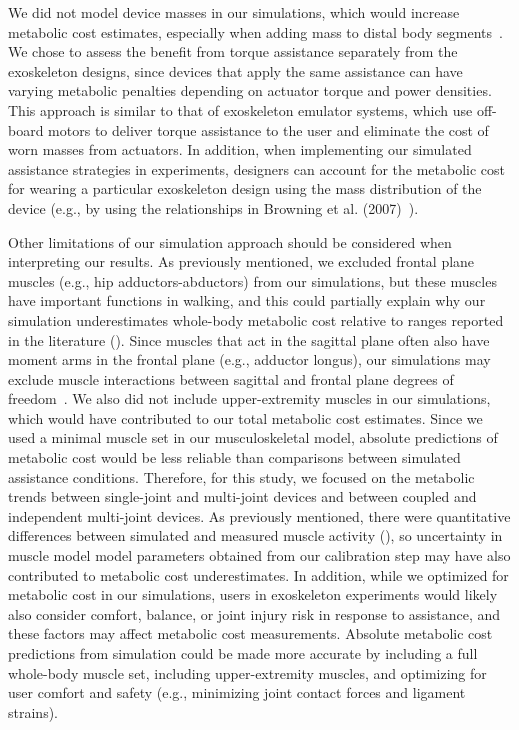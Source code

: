 \documentclass[10pt,letterpaper]{article}
\providecommand{\DIFaddtex}[1]{{\protect\color{blue}{#1}}} %
\providecommand{\DIFaddbegin}{} %
\providecommand{\DIFaddend}{} %
\providecommand{\DIFadd}[1]{\texorpdfstring{\DIFaddtex{#1}}{#1}} %
\newcommand{\DIFaddincludegraphics}[2][]{{\color{blue}\fbox{\DIFOincludegraphics[#1]{#2}}}} %
\DeclareRobustCommand{\DIFaddbegin}{\DIFOaddbegin \let\includegraphics\DIFaddincludegraphics} %
\DeclareRobustCommand{\DIFaddend}{\DIFOaddend \let\includegraphics\DIFOincludegraphics} %
\begin{document}
We did not model device masses in our simulations, which would increase metabolic cost estimates, especially when adding mass to distal body segments~\cite{Browning:2007}. We chose to assess the benefit from torque assistance separately from the exoskeleton designs, since devices that apply the same assistance can have varying metabolic penalties depending on actuator torque and power densities. This approach is similar to that of exoskeleton emulator systems, which use off-board motors to deliver torque assistance to the user and eliminate the cost of worn masses from actuators. In addition, when implementing our simulated assistance strategies in experiments, designers can account for the metabolic cost for wearing a particular exoskeleton design using the mass distribution of the device (e.g., by using the relationships in Browning et al. (2007)~\cite{Browning:2007}).

Other limitations of our simulation approach should be considered when interpreting our results. As previously mentioned, we excluded frontal plane muscles (e.g., hip adductors-abductors) from our simulations, but these muscles have important functions in walking, and this could partially explain why our simulation underestimates whole-body metabolic cost relative to ranges reported in the literature (). Since muscles that act in the sagittal plane often also have moment arms in the frontal plane (e.g., adductor longus), our simulations may exclude muscle interactions between sagittal and frontal plane degrees of freedom~\cite{Dembia:2017}. We also did not include upper-extremity muscles in our simulations, which would have contributed to our total metabolic cost estimates. Since we used a minimal muscle set in our musculoskeletal model, absolute predictions of metabolic cost would be less reliable than comparisons between simulated assistance conditions. Therefore, for this study, we focused on the metabolic trends between single-joint and multi-joint devices and between coupled and independent multi-joint devices. As previously mentioned, there were quantitative differences between simulated and measured muscle activity (), so uncertainty in muscle model model parameters obtained from our calibration step may have also contributed to metabolic cost underestimates. In addition, while we optimized for metabolic cost in our simulations, users in exoskeleton experiments would likely also consider comfort, balance, or joint injury risk in response to assistance, and these factors may affect metabolic cost measurements. Absolute metabolic cost predictions from simulation could be made more accurate by including a full whole-body muscle set, including upper-extremity muscles, and optimizing for user comfort and safety (e.g., minimizing joint contact forces and ligament strains). \DIFaddbegin \DIFadd{Finally, we created simulations using experimental gait data from only five subjects, which may partially explain why some of the multi-joint devices we tested did not produce significantly different metabolic cost changes compared to single-joint devices. 
}\DIFaddend 
\end{document}
